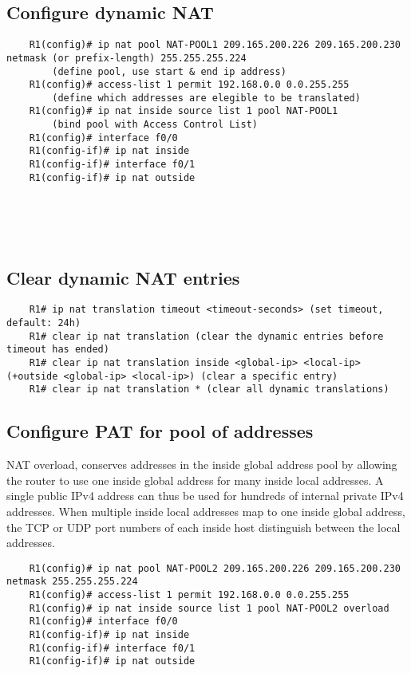 \documentclass[10pt, a4paper]{article}
\begin{document}
	\subsection{Configure dynamic NAT}
	\begin{lstlisting}
	R1(config)# ip nat pool NAT-POOL1 209.165.200.226 209.165.200.230 netmask (or prefix-length) 255.255.255.224 
		(define pool, use start & end ip address)
	R1(config)# access-list 1 permit 192.168.0.0 0.0.255.255
		(define which addresses are elegible to be translated)
	R1(config)# ip nat inside source list 1 pool NAT-POOL1 
		(bind pool with Access Control List)
	R1(config)# interface f0/0
	R1(config-if)# ip nat inside
	R1(config-if)# interface f0/1
	R1(config-if)# ip nat outside
	\end{lstlisting}
	\ \\ \\ \\
	
	\subsection{Clear dynamic NAT entries}
	\begin{lstlisting}
	R1# ip nat translation timeout <timeout-seconds> (set timeout, default: 24h)
	R1# clear ip nat translation (clear the dynamic entries before timeout has ended)
	R1# clear ip nat translation inside <global-ip> <local-ip> (+outside <global-ip> <local-ip>) (clear a specific entry)
	R1# clear ip nat translation * (clear all dynamic translations)
	\end{lstlisting}
	
	\subsection{Configure PAT for pool of addresses}
	NAT overload, conserves addresses in the inside global address pool by allowing the router to use one inside global address for many inside local addresses. A single public IPv4 address can thus be used for hundreds of internal private IPv4 addresses. When multiple inside local addresses map to one inside global address, the TCP or UDP port numbers of each inside host distinguish between the local addresses.\\
	\begin{lstlisting}
	R1(config)# ip nat pool NAT-POOL2 209.165.200.226 209.165.200.230 netmask 255.255.255.224
	R1(config)# access-list 1 permit 192.168.0.0 0.0.255.255
	R1(config)# ip nat inside source list 1 pool NAT-POOL2 overload
	R1(config)# interface f0/0
	R1(config-if)# ip nat inside
	R1(config-if)# interface f0/1
	R1(config-if)# ip nat outside
	\end{lstlisting}
	
\end{document}
